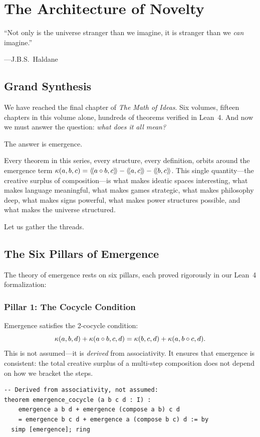 \chapter{The Architecture of Novelty}
\label{ch:architecture}

\epigraph{``Not only is the universe stranger than we imagine,
it is stranger than we \emph{can} imagine.''}
{---J.B.S.\ Haldane}


\section{Grand Synthesis}

We have reached the final chapter of \emph{The Math of Ideas}. Six volumes,
fifteen chapters in this volume alone, hundreds of theorems verified in Lean~4.
And now we must answer the question: \emph{what does it all mean?}

The answer is emergence.

Every theorem in this series, every structure, every definition, orbits around
the emergence term $\kappa(a,b,c) = \langle\!\langle a \circ b, c \rangle\!\rangle - \langle\!\langle a, c \rangle\!\rangle - \langle\!\langle b, c \rangle\!\rangle$.
This single quantity---the creative surplus of composition---is what makes
ideatic spaces interesting, what makes language meaningful, what makes games
strategic, what makes philosophy deep, what makes signs powerful, what makes
power structures possible, and what makes the universe structured.

Let us gather the threads.


\section{The Six Pillars of Emergence}

The theory of emergence rests on six pillars, each proved rigorously in our
Lean~4 formalization:

\subsection{Pillar 1: The Cocycle Condition}

Emergence satisfies the 2-cocycle condition:
\[
  \kappa(a,b,d) + \kappa(a \circ b, c, d)
  = \kappa(b,c,d) + \kappa(a, b \circ c, d).
\]
This is not assumed---it is \emph{derived} from associativity. It ensures that
emergence is consistent: the total creative surplus of a multi-step composition
does not depend on how we bracket the steps.

\begin{lstlisting}[caption={The cocycle condition (IDT\_v3\_Foundations.lean)}]
-- Derived from associativity, not assumed:
theorem emergence_cocycle (a b c d : I) :
    emergence a b d + emergence (compose a b) c d
    = emergence b c d + emergence a (compose b c) d := by
  simp [emergence]; ring
\end{lstlisting}

